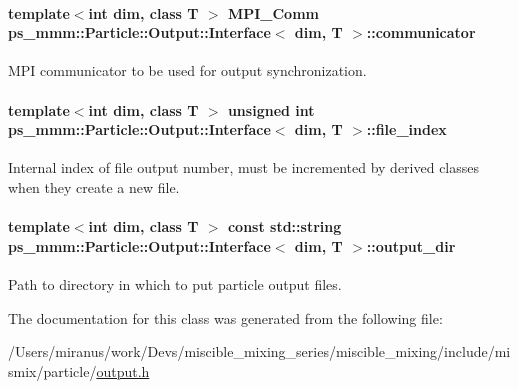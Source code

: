 \paragraph[{communicator}]{\setlength{\rightskip}{0pt plus 5cm}template$<$int dim, class T $>$ M\+P\+I\+\_\+\+Comm {\bf ps\+\_\+mmm\+::\+Particle\+::\+Output\+::\+Interface}$<$ dim, T $>$\+::communicator\hspace{0.3cm}{\ttfamily [protected]}}\label{classps__mmm_1_1_particle_1_1_output_1_1_interface_ae3fcfd82092c40864ec09918f03b91d0}


M\+P\+I communicator to be used for output synchronization. 

\hypertarget{classps__mmm_1_1_particle_1_1_output_1_1_interface_a8b748e316bf1e2f8c24b75cd99324e1b}{}
\paragraph[{file\+\_\+index}]{\setlength{\rightskip}{0pt plus 5cm}template$<$int dim, class T $>$ unsigned int {\bf ps\+\_\+mmm\+::\+Particle\+::\+Output\+::\+Interface}$<$ dim, T $>$\+::file\+\_\+index\hspace{0.3cm}{\ttfamily [protected]}}\label{classps__mmm_1_1_particle_1_1_output_1_1_interface_a8b748e316bf1e2f8c24b75cd99324e1b}


Internal index of file output number, must be incremented by derived classes when they create a new file. 

\hypertarget{classps__mmm_1_1_particle_1_1_output_1_1_interface_a61b1cff893c7c8909a3095cdc7c664b9}{}
\paragraph[{output\+\_\+dir}]{\setlength{\rightskip}{0pt plus 5cm}template$<$int dim, class T $>$ const std\+::string {\bf ps\+\_\+mmm\+::\+Particle\+::\+Output\+::\+Interface}$<$ dim, T $>$\+::output\+\_\+dir\hspace{0.3cm}{\ttfamily [protected]}}\label{classps__mmm_1_1_particle_1_1_output_1_1_interface_a61b1cff893c7c8909a3095cdc7c664b9}


Path to directory in which to put particle output files. 



The documentation for this class was generated from the following file\+:\begin{DoxyCompactItemize}
\item 
/\+Users/miranus/work/\+Devs/miscible\+\_\+mixing\+\_\+series/miscible\+\_\+mixing/include/mismix/particle/\hyperlink{output_8h}{output.\+h}\end{DoxyCompactItemize}
